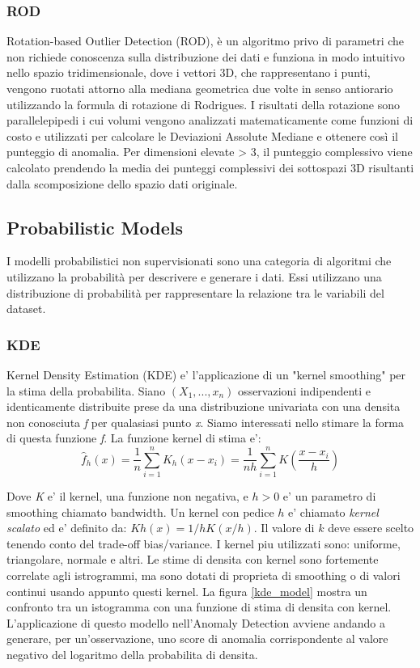 \subsubsection{ROD}
Rotation-based Outlier Detection (ROD),  è un algoritmo privo di parametri che non richiede conoscenza sulla distribuzione dei dati e funziona in modo intuitivo nello spazio tridimensionale, dove i vettori 3D, che rappresentano i punti, vengono ruotati attorno alla mediana geometrica due volte in senso antiorario utilizzando la formula di rotazione di Rodrigues. I risultati della rotazione sono parallelepipedi i cui volumi vengono analizzati matematicamente come funzioni di costo e utilizzati per calcolare le Deviazioni Assolute Mediane e ottenere così il punteggio di anomalia. Per dimensioni elevate > 3, il punteggio complessivo viene calcolato prendendo la media dei punteggi complessivi dei sottospazi 3D risultanti dalla scomposizione dello spazio dati originale.


\subsection{Probabilistic Models}
I modelli probabilistici non supervisionati sono una categoria di algoritmi che utilizzano la probabilità per descrivere e generare i dati. Essi utilizzano una distribuzione di probabilità per rappresentare la relazione tra le variabili del dataset.
\subsubsection{KDE}
Kernel Density Estimation (KDE) e' l'applicazione di un "kernel smoothing" per la stima della probabilita. 
Siano $(X_1,...,x_n)$ osservazioni indipendenti e identicamente distribuite prese da una distribuzione univariata con una densita non conosciuta \textit{f} per qualasiasi punto \textit{x}. Siamo interessati nello stimare la forma di questa funzione \textit{f}. La funzione kernel di stima e':
\[\widehat{f}_h(x)=\frac{1}{n} \sum_{i=1}^n K_h\left(x-x_i\right)=\frac{1}{n h} \sum_{i=1}^n K\left(\frac{x-x_i}{h}\right)\]

Dove \textit{K} e' il kernel, una funzione non negativa, e $h>0$ e' un parametro di smoothing chiamato bandwidth. Un kernel con pedice $h$ e' chiamato \textit{kernel scalato} ed e' definito da: $Kh(x) = 1/h K(x/h)$. 
Il valore di $k$ deve essere scelto tenendo conto del trade-off bias/variance.
I kernel piu utilizzati sono: uniforme, triangolare, normale e altri.
Le stime di densita con kernel sono fortemente correlate agli istrogrammi, ma sono dotati di proprieta di smoothing o di valori continui usando appunto questi kernel.
La figura \ref{kde_model} mostra un confronto tra un istogramma con una funzione di stima di densita con kernel.
L'applicazione di questo modello nell'Anomaly Detection avviene andando a generare, per un'osservazione, uno score di anomalia corrispondente al valore negativo del logaritmo della probabilita di densita.

